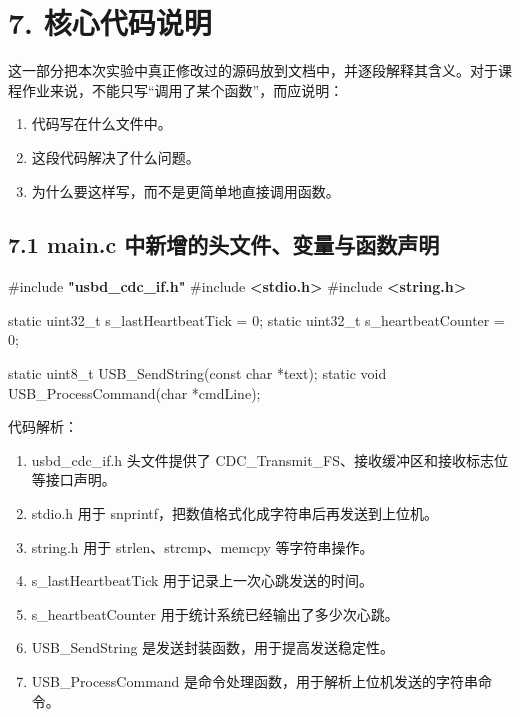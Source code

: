 \documentclass[
  chinese,
  UTF8,
  oneside,
  openany]{ctexbook}
\newenvironment{Shaded}{}{}
\newcommand{\DataTypeTok}[1]{\textcolor[rgb]{0.56,0.13,0.00}{#1}}
\newcommand{\DecValTok}[1]{\textcolor[rgb]{0.25,0.63,0.44}{#1}}
\newcommand{\ImportTok}[1]{\textcolor[rgb]{0.00,0.50,0.00}{\textbf{#1}}}
\newcommand{\NormalTok}[1]{#1}
\newcommand{\OperatorTok}[1]{\textcolor[rgb]{0.40,0.40,0.40}{#1}}
\newcommand{\PreprocessorTok}[1]{\textcolor[rgb]{0.74,0.48,0.00}{#1}}
\providecommand{\tightlist}{%
  \setlength{\itemsep}{0pt}\setlength{\parskip}{0pt}}
\begin{document}
\section{7. 核心代码说明}\label{ux6838ux5fc3ux4ee3ux7801ux8bf4ux660e}

这一部分把本次实验中真正修改过的源码放到文档中，并逐段解释其含义。对于课程作业来说，不能只写``调用了某个函数''，而应说明：

\begin{enumerate}
\def\labelenumi{\arabic{enumi}.}
\tightlist
\item
  代码写在什么文件中。
\item
  这段代码解决了什么问题。
\item
  为什么要这样写，而不是更简单地直接调用函数。
\end{enumerate}

\subsection{7.1 main.c
中新增的头文件、变量与函数声明}\label{main.c-ux4e2dux65b0ux589eux7684ux5934ux6587ux4ef6ux53d8ux91cfux4e0eux51fdux6570ux58f0ux660e}

\begin{Shaded}
\begin{Highlighting}[]
\PreprocessorTok{\#include }\ImportTok{"usbd\_cdc\_if.h"}
\PreprocessorTok{\#include }\ImportTok{\textless{}stdio.h\textgreater{}}
\PreprocessorTok{\#include }\ImportTok{\textless{}string.h\textgreater{}}

\DataTypeTok{static} \DataTypeTok{uint32\_t}\NormalTok{ s\_lastHeartbeatTick }\OperatorTok{=} \DecValTok{0}\OperatorTok{;}
\DataTypeTok{static} \DataTypeTok{uint32\_t}\NormalTok{ s\_heartbeatCounter }\OperatorTok{=} \DecValTok{0}\OperatorTok{;}

\DataTypeTok{static} \DataTypeTok{uint8\_t}\NormalTok{ USB\_SendString}\OperatorTok{(}\DataTypeTok{const} \DataTypeTok{char} \OperatorTok{*}\NormalTok{text}\OperatorTok{);}
\DataTypeTok{static} \DataTypeTok{void}\NormalTok{ USB\_ProcessCommand}\OperatorTok{(}\DataTypeTok{char} \OperatorTok{*}\NormalTok{cmdLine}\OperatorTok{);}
\end{Highlighting}
\end{Shaded}

代码解析：

\begin{enumerate}
\def\labelenumi{\arabic{enumi}.}
\tightlist
\item
  usbd\_cdc\_if.h 头文件提供了
  CDC\_Transmit\_FS、接收缓冲区和接收标志位等接口声明。
\item
  stdio.h 用于 snprintf，把数值格式化成字符串后再发送到上位机。
\item
  string.h 用于 strlen、strcmp、memcpy 等字符串操作。
\item
  s\_lastHeartbeatTick 用于记录上一次心跳发送的时间。
\item
  s\_heartbeatCounter 用于统计系统已经输出了多少次心跳。
\item
  USB\_SendString 是发送封装函数，用于提高发送稳定性。
\item
  USB\_ProcessCommand 是命令处理函数，用于解析上位机发送的字符串命令。
\end{enumerate}
\end{document}
